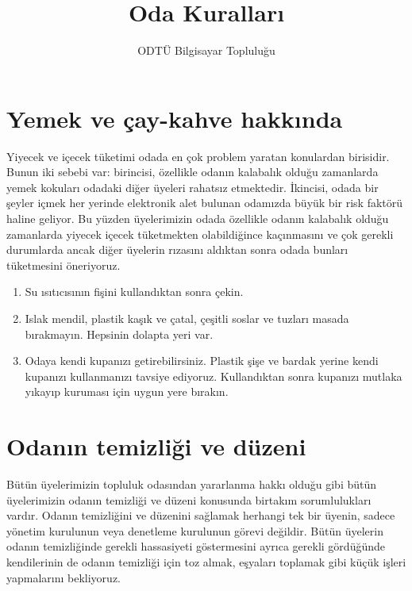 \documentclass{article}
\title{Oda Kuralları}
\author{ODTÜ Bilgisayar Topluluğu}
\begin{document}
\maketitle

\section{Yemek ve çay-kahve hakkında}

Yiyecek ve içecek tüketimi odada en çok problem yaratan konulardan birisidir.
Bunun iki sebebi var: birincisi, özellikle odanın kalabalık olduğu zamanlarda
yemek kokuları odadaki diğer üyeleri rahatsız etmektedir. İkincisi, odada bir
şeyler içmek her yerinde elektronik alet bulunan odamızda büyük bir risk
faktörü haline geliyor. Bu yüzden üyelerimizin odada özellikle odanın kalabalık
olduğu zamanlarda yiyecek içecek tüketmekten olabildiğince kaçınmasını ve çok
gerekli durumlarda ancak diğer üyelerin rızasını aldıktan sonra odada bunları
tüketmesini öneriyoruz.

\begin{enumerate}
	\item Su ısıtıcısının fişini kullandıktan sonra çekin.
	\item Islak mendil, plastik kaşık ve çatal, çeşitli soslar ve tuzları
		masada bırakmayın. Hepsinin dolapta yeri var. 
	\item Odaya kendi kupanızı getirebilirsiniz. Plastik şişe ve bardak
		yerine kendi kupanızı kullanmanızı tavsiye ediyoruz.
		Kullandıktan sonra kupanızı mutlaka yıkayıp kuruması için uygun
		yere bırakın.
\end{enumerate}

\section{Odanın temizliği ve düzeni}

Bütün üyelerimizin topluluk odasından yararlanma hakkı olduğu gibi bütün
üyelerimizin odanın temizliği ve düzeni konusunda birtakım sorumlulukları
vardır. Odanın temizliğini ve düzenini sağlamak herhangi tek bir üyenin, sadece
yönetim kurulunun veya denetleme kurulunun görevi değildir. Bütün üyelerin
odanın temizliğinde gerekli hassasiyeti göstermesini ayrıca gerekli gördüğünde
kendilerinin de odanın temizliği için toz almak, eşyaları toplamak gibi küçük
işleri yapmalarını bekliyoruz.
\end{document}
